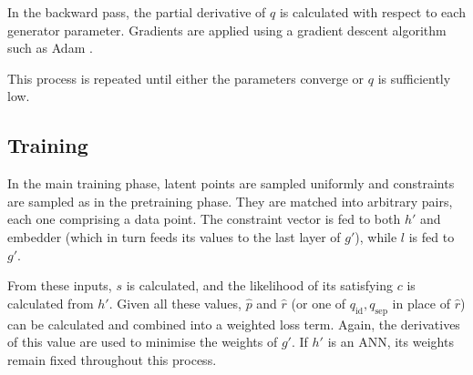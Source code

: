 \documentclass[../../main.tex]{subfiles}
\begin{document}
In the backward pass, the partial derivative of $q$ is calculated with respect to each generator parameter.
Gradients are applied using a gradient descent algorithm such as Adam \cite{kingma17}.

This process is repeated until either the parameters converge or $q$ is sufficiently low.

\subsection{Training} \label{subsection:training}

In the main training phase, latent points are sampled uniformly and constraints are sampled as in the pretraining phase.
They are matched into arbitrary pairs, each one comprising a data point.
The constraint vector is fed to both $h'$ and embedder (which in turn feeds its values to the last layer of $g'$), while $l$ is fed to $g'$.

From these inputs, $s$ is calculated, and the likelihood of its satisfying $c$ is calculated from $h'$.
Given all these values, $\hat{p}$ and $\hat{r}$ (or one of $q_\text{id},q_\text{sep}$ in place of $\hat{r}$) can be calculated and combined into a weighted loss term.
Again, the derivatives of this value are used to minimise the weights of $g'$.
If $h'$ is an ANN, its weights remain fixed throughout this process.
\end{document}
